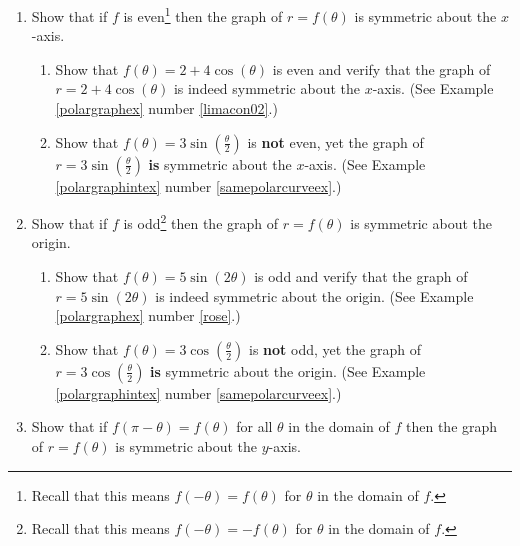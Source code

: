 \documentclass{ximera}
\begin{document}
\begin{enumerate}

\setcounter{enumi}{\value{HW}}

\item Show that if $f$ is even\footnote{Recall that this means $f(-\theta) = f(\theta)$ for $\theta$ in the domain of $f$.} then the graph of $r = f(\theta)$ is symmetric about the $x$-axis. \label{sympolarfirst}

\begin{enumerate}

\item Show that $f(\theta) = 2 + 4\cos(\theta)$ is even and verify that the graph of  $r = 2+4\cos(\theta)$ is indeed symmetric about the $x$-axis.  (See Example \ref{polargraphex} number \ref{limacon02}.)

\item Show that $f(\theta) = 3\sin\left(\frac{\theta}{2}\right)$ is \textbf{not} even, yet the graph of $r = 3\sin\left(\frac{\theta}{2}\right)$ \textbf{is} symmetric about the $x$-axis.  (See  Example \ref{polargraphintex} number \ref{samepolarcurveex}.) 

\end{enumerate}

\item  Show that if $f$ is odd\footnote{Recall that this means $f(-\theta) = -f(\theta)$ for $\theta$ in the domain of $f$.} then the graph of $r = f(\theta)$ is symmetric about the origin.

\begin{enumerate}

\item  Show that $f(\theta) = 5\sin(2\theta)$ is odd and verify that the graph of $r = 5\sin(2\theta)$ is indeed symmetric about the origin.  (See Example \ref{polargraphex} number \ref{rose}.)

\item  Show that $f(\theta) = 3\cos\left(\frac{\theta}{2}\right)$ is \textbf{not} odd, yet the graph of $r = 3\cos\left(\frac{\theta}{2}\right)$ \textbf{is} symmetric about the origin.  (See  Example \ref{polargraphintex} number \ref{samepolarcurveex}.)

\end{enumerate}

\newpage

\item  Show that if $ f(\pi-\theta)=f(\theta)$ for all $\theta$ in the domain of $f$ then the graph of $r = f(\theta)$ is symmetric about the $y$-axis. \label{sympolarlast}


\end{enumerate}
\end{document}
